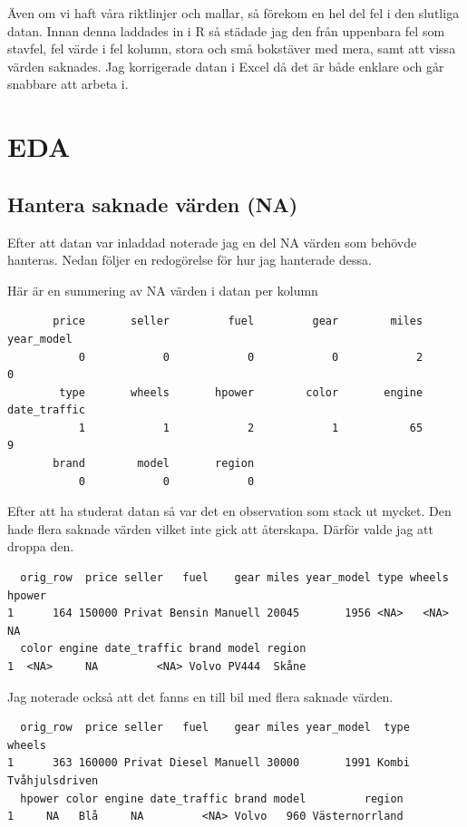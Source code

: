 \documentclass[
  letterpaper,
  DIV=11,
  numbers=noendperiod]{scrreprt}
\begin{document}
Även om vi haft våra riktlinjer och mallar, så förekom en hel del fel i
den slutliga datan. Innan denna laddades in i R så städade jag den från
uppenbara fel som stavfel, fel värde i fel kolumn, stora och små
bokstäver med mera, samt att vissa värden saknades. Jag korrigerade
datan i Excel då det är både enklare och går snabbare att arbeta i.

\section{EDA}\label{eda}

\subsection{Hantera saknade värden
(NA)}\label{hantera-saknade-vuxe4rden-na}

Efter att datan var inladdad noterade jag en del NA värden som behövde
hanteras. Nedan följer en redogörelse för hur jag hanterade dessa.

Här är en summering av NA värden i datan per kolumn

\begin{verbatim}
       price       seller         fuel         gear        miles   year_model 
           0            0            0            0            2            0 
        type       wheels       hpower        color       engine date_traffic 
           1            1            2            1           65            9 
       brand        model       region 
           0            0            0 
\end{verbatim}

Efter att ha studerat datan så var det en observation som stack ut
mycket. Den hade flera saknade värden vilket inte gick att återskapa.
Därför valde jag att droppa den.

\begin{verbatim}
  orig_row  price seller   fuel    gear miles year_model type wheels hpower
1      164 150000 Privat Bensin Manuell 20045       1956 <NA>   <NA>     NA
  color engine date_traffic brand model region
1  <NA>     NA         <NA> Volvo PV444  Skåne
\end{verbatim}

Jag noterade också att det fanns en till bil med flera saknade värden.

\begin{verbatim}
  orig_row  price seller   fuel    gear miles year_model  type         wheels
1      363 160000 Privat Diesel Manuell 30000       1991 Kombi Tvåhjulsdriven
  hpower color engine date_traffic brand model         region
1     NA   Blå     NA         <NA> Volvo   960 Västernorrland
\end{verbatim}
\end{document}
